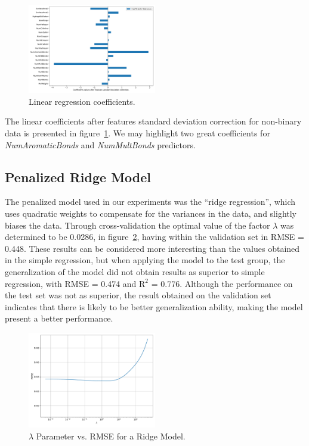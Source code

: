 \begin{figure}[htbp!]
  \centerline{\includegraphics[width=0.5\textwidth]{../../code/hw2/figures/2-linear-regression-coefficients.pdf}}
  \caption{Linear regression coefficients.}
  \label{fig:2-linear-regression-coefficients}
\end{figure}


The linear coefficients after features standard deviation correction for non-binary data is presented in figure~\ref{fig:2-linear-regression-coefficients}. We may highlight two great coefficients for \textit{NumAromaticBonds} and \textit{NumMultBonds} predictors.

\subsection{Penalized Ridge Model}
The penalized model used in our experiments was the ``ridge regression'', which uses quadratic weights to compensate for the variances in the data, and slightly biases the data. Through cross-validation the optimal value of the factor $\lambda$ was determined to be 0.0286, in figure~\ref{fig:3-lambda-ridge}, having within the validation set in RMSE = 0.448. These results can be considered more interesting than the values obtained in the simple regression, but when applying the model to the test group, the generalization of the model did not obtain results as superior to simple regression, with RMSE = 0.474 and $\text{R}^2$ = 0.776. Although the performance on the test set was not as superior, the result obtained on the validation set indicates that there is likely to be better generalization ability, making the model present a better performance.

\begin{figure}[htbp!]
  \centerline{\includegraphics[width=0.5\textwidth]{../../code/hw2/figures/3-lambda-ridge.pdf}}
  \caption{$\lambda$ Parameter vs. RMSE for a Ridge Model.}
  \label{fig:3-lambda-ridge}
\end{figure}

